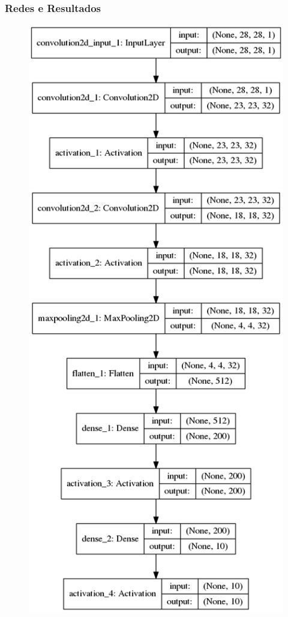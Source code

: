 \documentclass[tikz,11pt]{beamer}
\begin{document}
\begin{frame}
	\frametitle{Redes e Resultados}

    \begin{figure}
	\centering
	\begin{minipage}{.33\textwidth}
		\centering
		\includegraphics[width=.4\linewidth]{images/resultados/default/model}
	\end{minipage}%
	\begin{minipage}{.33\textwidth}
		\centering

\end{minipage}
\end{figure}
\end{frame}
\end{document}
